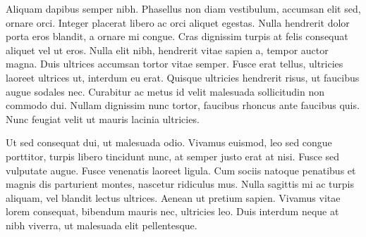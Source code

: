\documentclass[a4paper,12pt,twoside,openright]{report}
\numberwithin{equation}{section}
\begin{document}
Aliquam dapibus semper nibh. Phasellus non diam vestibulum, accumsan elit sed, ornare orci. Integer placerat libero ac orci aliquet egestas. Nulla hendrerit dolor porta eros blandit, a ornare mi congue. Cras dignissim turpis at felis consequat aliquet vel ut eros. Nulla elit nibh, hendrerit vitae sapien a, tempor auctor magna. Duis ultrices accumsan tortor vitae semper. Fusce erat tellus, ultricies laoreet ultrices ut, interdum eu erat. Quisque ultricies hendrerit risus, ut faucibus augue sodales nec. Curabitur ac metus id velit malesuada sollicitudin non commodo dui. Nullam dignissim nunc tortor, faucibus rhoncus ante faucibus quis. Nunc feugiat velit ut mauris lacinia ultricies.

Ut sed consequat dui, ut malesuada odio. Vivamus euismod, leo sed congue porttitor, turpis libero tincidunt nunc, at semper justo erat at nisi. Fusce sed vulputate augue. Fusce venenatis laoreet ligula. Cum sociis natoque penatibus et magnis dis parturient montes, nascetur ridiculus mus. Nulla sagittis mi ac turpis aliquam, vel blandit lectus ultrices. Aenean ut pretium sapien. Vivamus vitae lorem consequat, bibendum mauris nec, ultricies leo. Duis interdum neque at nibh viverra, ut malesuada elit pellentesque.

\begin{appendices}

\end{appendices}



\end{document}
